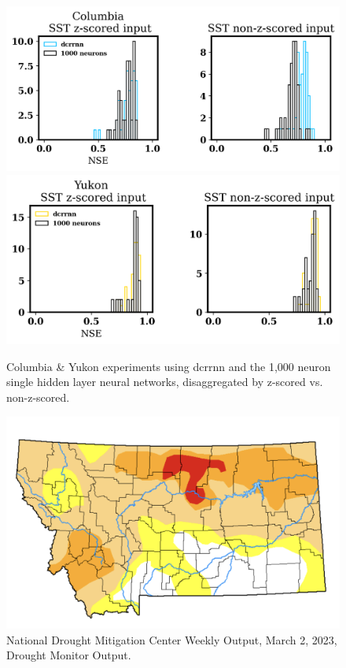 \begin{figure}[!ht]
	\centering
    \caption{Columbia \& Yukon experiments using dcrrnn and the 1,000 neuron single hidden layer neural networks, disaggregated by z-scored vs. non-z-scored.}
	\includegraphics[width=1.0\linewidth]{m3/ims/fig3_8a.png}
    \includegraphics[width=1.0\linewidth]{m3/ims/fig3_8b.png}
    \label{fig3_8}
\end{figure}

\begin{figure}[!ht]
	\centering
    \caption{National Drought Mitigation Center Weekly Output, March 2, 2023, Drought Monitor Output.}
	\includegraphics[width=1.0\linewidth]{m3/ims/fig3_9.png}

    \label{fig3_9}
\end{figure}

